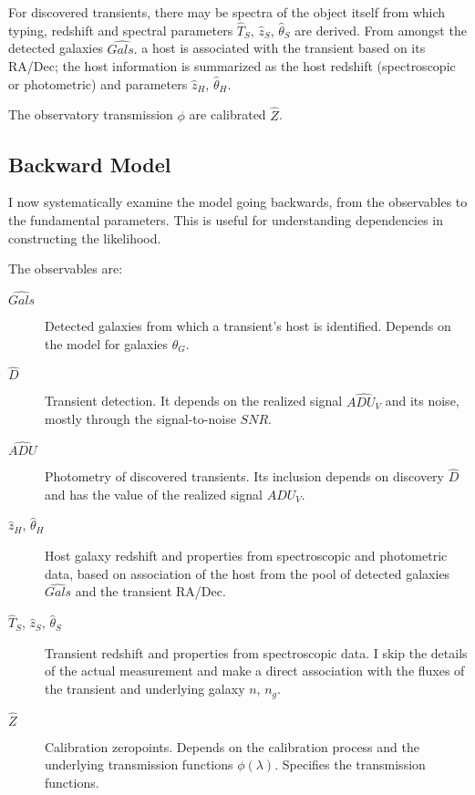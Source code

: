 \documentclass[preprint]{aastex}
\begin{document}
For discovered transients, there may be spectra of the object itself
from which typing, redshift and spectral parameters $\hat{T}_S$, $\hat{z}_S$, $\hat{\theta}_S$ are derived.
From amongst the detected galaxies $\hat{\mathit{Gals.}}$  a host is associated with the transient
based on its RA/Dec; the host information is summarized as the
host redshift (spectroscopic or photometric) and parameters $\hat{z}_{H}$, $\hat{\theta}_H$.

The observatory transmission $\phi$ are calibrated $\hat{Z}$.


\subsection{Backward Model}
 
I now systematically
examine the model going backwards, from the observables to the fundamental parameters.
This is useful for understanding dependencies in constructing the likelihood.

The observables are:
\begin{description}
\item[$\hat{\mathit{Gals}}$] Detected galaxies from which a transient's host is identified.
Depends on the model for galaxies $\theta_G$.
\item[$\hat{D}$] Transient detection.  It depends on
the realized signal $\hat{\mathit{ADU}_V}$ and its noise, mostly through the signal-to-noise
$\mathit{SNR}$.
\item[$\hat{\mathit{ADU}}$]  Photometry of discovered transients.  Its inclusion
depends on discovery $\hat{D}$ and has the value of the realized signal $\mathit{ADU}_V$.
\item[$\hat{z}_H$, $\hat{\theta}_H$] Host galaxy redshift and properties from spectroscopic
and photometric data, based on association
of the host from the pool of detected galaxies $\hat{\mathit{Gals}}$ and the transient RA/Dec.
\item[$\hat{T}_S$, $\hat{z}_S$, $\hat{\theta}_S$] Transient redshift and properties from
spectroscopic data. I skip the details of the actual measurement  and make a direct association
with the fluxes of the transient and underlying galaxy $n$, $n_g$.
\item[$\hat{Z}$] Calibration zeropoints.  Depends on the calibration process
and the underlying transmission functions $\phi(\lambda)$.  Specifies
the transmission functions.
\end{description}
\end{document}
